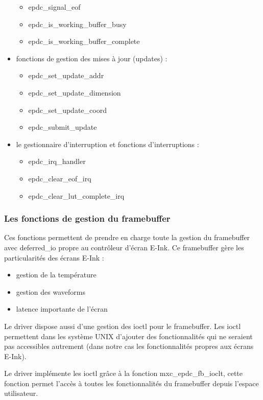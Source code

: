 \begin{itemize}
\begin{itemize}
			\item epdc\_signal\_eof
			\item epdc\_is\_working\_buffer\_busy
			\item epdc\_is\_working\_buffer\_complete
		\end{itemize}
	\item fonctions de gestion des mises à jour (updates) : 
		\begin{itemize}
			\item epdc\_set\_update\_addr
			\item epdc\_set\_update\_dimension
			\item epdc\_set\_update\_coord
			\item epdc\_submit\_update
		\end{itemize}
	\item le gestionnaire d'interruption et fonctions d'interruptions : 
	\begin{itemize}
		\item epdc\_irq\_handler
		\item epdc\_clear\_eof\_irq
		\item epdc\_clear\_lut\_complete\_irq
	\end{itemize}
\end{itemize}

\subsubsection{Les fonctions de gestion du framebuffer}

Ces fonctions permettent de prendre en charge toute la gestion du framebuffer avec deferred\_io 
propre au contrôleur d'écran E-Ink.
Ce framebuffer gère les particularités des écrans E-Ink : 
	\begin{itemize}
		\item gestion de la température
		\item gestion des waveforms
		\item latence importante de l'écran
	\end{itemize}

Le driver dispose aussi d'une gestion des ioctl pour le framebuffer.
Les ioctl permettent dans les système UNIX d'ajouter des fonctionnalités qui ne seraient pas accessibles autrement (dans notre cas les fonctionnalités propres aux écrans E-Ink).

Le driver implémente les ioctl grâce à la fonction mxc\_epdc\_fb\_ioclt, cette fonction permet l'accès à toutes les fonctionnalités du framebuffer depuis l'espace utilisateur.

